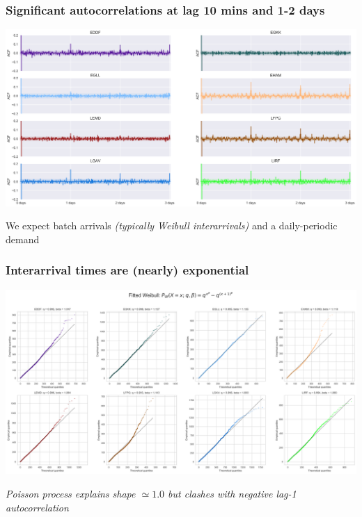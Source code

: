 \documentclass[table,aspectratio=169]{beamer}
\begin{document}
\begin{frame}[t]\frametitle{Significant autocorrelations at lag 10 mins and 1-2 days}
    \centering
    \includegraphics[width=.7\textwidth]{Autocorr}

    \hfill

    We expect \alert{batch arrivals} \emph{(typically Weibull interarrivals)}
    and a \alert{daily-periodic demand}
\end{frame}

\begin{frame}[t]\frametitle{Interarrival times are (nearly) exponential}
    \centering
    \includegraphics[width=.65\textwidth]{IA_qqplot0800-0930}

    \hfill

    \emph{Poisson process explains shape $\simeq 1.0$
    but clashes with negative lag-1 autocorrelation}
\end{frame}
\end{document}
